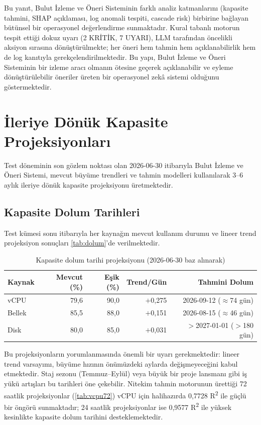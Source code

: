 Bu yanıt, Bulut İzleme ve Öneri Sisteminin farklı analiz katmanlarını (kapasite tahmini, SHAP açıklaması, log anomali tespiti, cascade risk) birbirine bağlayan bütünsel bir operasyonel değerlendirme sunmaktadır.
Kural tabanlı motorun tespit ettiği dokuz uyarı (2 KRİTİK, 7 UYARI), LLM tarafından öncelikli aksiyon sırasına dönüştürülmekte; her öneri hem tahmin hem açıklanabilirlik hem de log kanıtıyla gerekçelendirilmektedir.
Bu yapı, Bulut İzleme ve Öneri Sisteminin bir izleme aracı olmanın ötesine geçerek açıklanabilir ve eyleme dönüştürülebilir öneriler üreten bir operasyonel zekâ sistemi olduğunu göstermektedir.


\section{İleriye Dönük Kapasite Projeksiyonları}
\label{sec:projeksiyon}

Test döneminin son gözlem noktası olan 2026-06-30 itibarıyla Bulut İzleme ve Öneri Sistemi, mevcut büyüme trendleri ve tahmin modelleri kullanılarak 3--6 aylık ileriye dönük kapasite projeksiyonu üretmektedir.

\subsection{Kapasite Dolum Tarihleri}

Test kümesi sonu itibarıyla her kaynağın mevcut kullanım durumu ve lineer trend projeksiyon sonuçları \autoref{tab:dolum}'de verilmektedir.

\begin{table}[htbp]
    \centering
    \caption{Kapasite dolum tarihi projeksiyonu (2026-06-30 baz alınarak)}
    \label{tab:dolum}
    \begin{tabular}{lrrrr}
        \textbf{Kaynak} & \textbf{Mevcut (\%)} & \textbf{Eşik (\%)} & \textbf{Trend/Gün} & \textbf{Tahmini Dolum} \\
        \hline
        vCPU   & 79{,}6 & 90{,}0 & $+$0{,}275 & 2026-09-12 ($\approx$74 gün) \\
        Bellek & 85{,}5 & 88{,}0 & $+$0{,}151 & 2026-08-15 ($\approx$46 gün) \\
        Disk   & 80{,}0 & 85{,}0 & $+$0{,}031 & $>$2027-01-01 ($>$180 gün) \\
    \end{tabular}
\end{table}

Bu projeksiyonların yorumlanmasında önemli bir uyarı gerekmektedir: lineer trend varsayımı, büyüme hızının önümüzdeki aylarda değişmeyeceğini kabul etmektedir.
Staj sezonu (Temmuz--Eylül) veya büyük bir proje lansmanı gibi iş yükü artışları bu tarihleri öne çekebilir.
Nitekim tahmin motorunun ürettiği 72 saatlik projeksiyonlar (\autoref{tab:vcpu72}) vCPU için halihazırda 0{,}7728 R\textsuperscript{2} ile güçlü bir öngörü sunmaktadır; 24 saatlik projeksiyonlar ise 0{,}9577 R\textsuperscript{2} ile yüksek kesinlikte kapasite dolum tarihini desteklemektedir.

